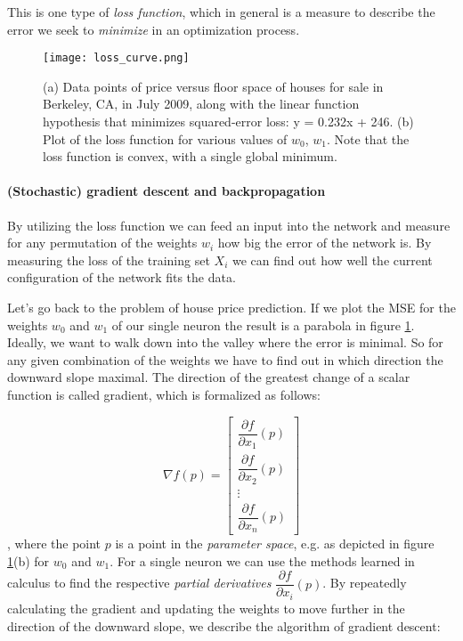 This is one type of \textit{loss function}, which in general is a measure to describe the error we seek to \textit{minimize} in an optimization process.

\begin{figure}
    \centering
    \texttt{[image: loss\_curve.png]}
    \caption{(a) Data points of price versus floor space of houses for sale in Berkeley, CA, in July 2009, along with the linear function hypothesis that minimizes squared-error loss: y = 0.232x + 246. (b) Plot of the loss function for various values of $ w_0 $, $ w_1 $. Note that the loss function is convex, with a single global minimum. \cite[p. 1251]{russell_artificial_2021}}
    \label{loss_curve}
\end{figure}

\paragraph{(Stochastic) gradient descent and backpropagation} By utilizing the loss function we can feed an input into the network and measure for any permutation of the weights $ w_i $ how big the error of the network is. By measuring the loss of the training set $ X_i $ we can find out how well the current configuration of the network fits the data.

Let's go back to the problem of house price prediction. If we plot the MSE for the weights $ w_0 $ and $ w_1 $ of our single neuron the result is a parabola in figure \ref{loss_curve}. Ideally, we want to walk down into the valley where the error is minimal. So for any given combination of the weights we have to find out in which direction the downward slope maximal. The direction of the greatest change of a scalar function is called gradient, which is formalized as follows:

$$
    \nabla f(p)=\left[\begin{array}{c}
            \dfrac{\partial f}{\partial x_1}(p) \\
            \dfrac{\partial f}{\partial x_2}(p) \\
            \vdots                              \\
            \dfrac{\partial f}{\partial x_n}(p)
        \end{array}\right]
$$,
where the point $p $ is a point in the \textit{parameter space}, e.g. as depicted in figure \ref{loss_curve}(b) for $w_0 $ and $ w_1 $. For a single neuron we can use the methods learned in calculus to find the respective \textit{partial derivatives} $  \dfrac{\partial f}{\partial x_i}(p) $. By repeatedly calculating the gradient and updating the weights to move further in the direction of the downward slope, we describe the algorithm of gradient descent:

